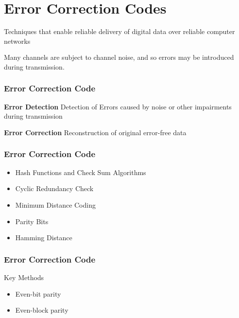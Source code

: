 
\section{Error Correction Codes}
Techniques that enable reliable delivery of digital data over reliable computer networks

Many channels are subject to channel noise, and so errors may be introduced during transmission.

\begin{frame}
\frametitle{Error Correction Code}
\Large

\textbf{Error Detection}
Detection of Errors caused by noise or other impairments during transmission

\textbf{Error Correction}
Reconstruction of original error-free data

\end{frame}
\begin{frame}
\frametitle{Error Correction Code}
\Large
\begin{itemize}
\item Hash Functions and Check Sum Algorithms 
\item Cyclic Redundancy Check
\item Minimum Distance Coding
\item Parity Bits
\item Hamming Distance
\end{itemize}

\end{frame}
\begin{frame}
\frametitle{Error Correction Code}
\Large

Key Methods
\begin{itemize}
\item Even-bit parity
\item Even-block parity
\end{itemize}
\end{frame}
